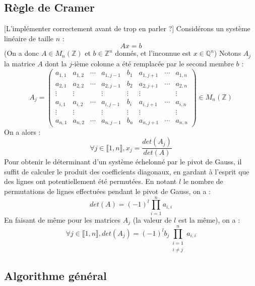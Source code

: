 \documentclass[french]{article}
\begin{document}
\subsection{Règle de Cramer} \label{subsec:cramer}
[L'implémenter correctement avant de trop en parler ?]
\newline
Considérons un système linéaire de taille $n$ :
$$ A x = b$$
(On a donc $A \in M_n(\mathbb{Z})$ et $b \in \mathbb{Z}^n$ donnés, et l'inconnue est $x \in \mathbb{Q}^n$)
\newline
Notons $A_j$ la matrice $A$ dont la $j$-ième colonne a été remplacée par le second membre $b$ :
\begin{equation*}
	A_j = 
	\begin{pmatrix}
		a_{1,1} & a_{1,2} & \cdots & a_{1,j-1} & b_1 & a_{1,j+1} & \cdots & a_{1,n}\\
		a_{2,1} & a_{2,2} & \cdots & a_{2,j-1} & b_2 & a_{2,j+1} & \cdots & a_{2,n}\\
		\vdots  & \vdots  & & \vdots & \vdots & \vdots & & \vdots\\
		a_{i,1} & a_{i,2} & \cdots & a_{i,j-1} & b_i & a_{i,j+1} & \cdots & a_{i,n}\\
		\vdots  & \vdots  & & \vdots & \vdots & \vdots & & \vdots\\
		a_{n,1} & a_{n,2} & \cdots & a_{n,j-1} & b_n & a_{n,j+1} &\cdots & a_{n,n}
	\end{pmatrix}
	\in M_n(\mathbb{Z})
\end{equation*}
On a alors :
$$ \forall j \in \llbracket1,n\rrbracket, x_j = \frac{det(A_j)}{det(A)}$$
\newline
Pour obtenir le déterminant d'un système échelonné par le pivot de Gauss, il suffit de calculer le produit des coefficients diagonaux, en gardant à l'esprit que des lignes ont potentiellement été permutées. En notant $l$ le nombre de permutations de lignes effectuées pendant le pivot de Gauss, on a :
$$ det(A) = (-1)^l\prod_{i = 1}^na_{i,i}$$
En faisant de même pour les matrices $A_j$ (la valeur de $l$ est la même), on a :
$$ \forall j \in \llbracket1,n\rrbracket, det(A_j) = (-1)^l b_j \prod_{\substack{i=1 \\ i\neq j}}^na_{i,i}$$
\subsection{Algorithme général}
\end{document}
